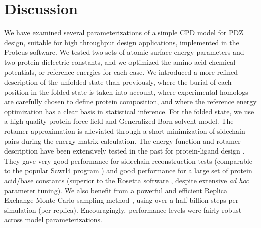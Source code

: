 \documentclass[12pt]{article}
\begin{document}
\section{Discussion}
We have examined several parameterizations of a simple CPD model for PDZ design, suitable for high throughput design applications,
implemented in the Proteus software. We tested two sets of atomic surface energy parameters and two protein dielectric constants,
and we optimized the amino acid chemical potentials, or reference energies for each case. We introduced a more refined description
of the unfolded state than previously, where the burial of each position in the folded state is taken into account, where experimental
homologs are carefully chosen to define protein composition, and where the reference energy optimization has a clear basis in
statistical inference. For the folded state, we use a high quality protein force field and Generalized Born solvent model. The
rotamer approximation is alleviated through a short minimization of sidechain pairs during the energy matrix calculation. The
energy function and rotamer description have been extensively tested in the past for protein-ligand design \cite{Polydorides11,
Druart16}. They gave very good performance for sidechain reconstruction tests \cite{Gaillard16} (comparable to the popular Scwrl4
program \cite{Krivov09}) and good performance for a large set of protein acid/base constants \cite{Polydorides13} (superior to
the Rosetta software \cite{Kilambi12}, despite extensive {\it ad hoc} parameter tuning). We also benefit from a powerful and
efficient Replica Exchange Monte Carlo sampling method \cite{Mignon16}, using over a half billion steps per simulation (per
replica). Encouragingly, performance levels were fairly robust across model parameterizations.
\end{document}

